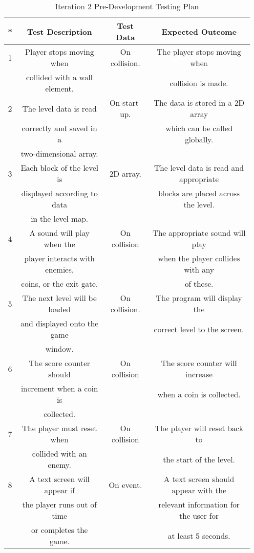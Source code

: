 \documentclass[12pt]{report}
\begin{document}
\begin{table}[H]
    \centering
    \begin{tabular}{|c|c|c|c|}
    \hline
    \textbf{*} & \textbf{Test Description} & \textbf{Test Data} & \textbf{Expected Outcome}\\
    \hline
    1 & Player stops moving when & On collision. & The player stops moving when \\
    & collided with a wall element. & & collision is made.\\
    \hline
    2 & The level data is read & On start-up. & The data is stored in a 2D array\\
      & correctly and saved in a&             & which can be called globally. \\
      & two-dimensional array. & &\\
    \hline
    3 & Each block of the level is & 2D array. & The level data is read and appropriate\\
    & displayed according to data &           & blocks are placed across the level. \\
    & in the level map. & &\\
    \hline
    4 & A sound will play when the & On collision & The appropriate sound will play\\
    & player interacts with enemies, & & when the player collides with any  \\
    & coins, or the exit gate. & & of these.\\
    \hline
    5 & The next level will be loaded & On collision. & The program will display the \\
    & and displayed onto the game & & correct level to the screen. \\
    & window. & & \\
    \hline
    6 & The score counter should & On collision & The score counter will increase\\
    & increment when a coin is & & when a coin is collected.\\
    & collected. & & \\
    \hline
    7 & The player must reset when & On collision & The player will reset back to\\
    & collided with an enemy. & & the start of the level.\\
    \hline
    8 & A text screen will appear if & On event. & A text screen should appear with the \\
      & the player runs out of time & & relevant information for the user for \\
      & or completes the game. & & at least 5 seconds.  \\
    \hline
    \end{tabular}
    \caption{Iteration 2 Pre-Development Testing Plan}
    \label{TestTable}
\end{table}
\end{document}
